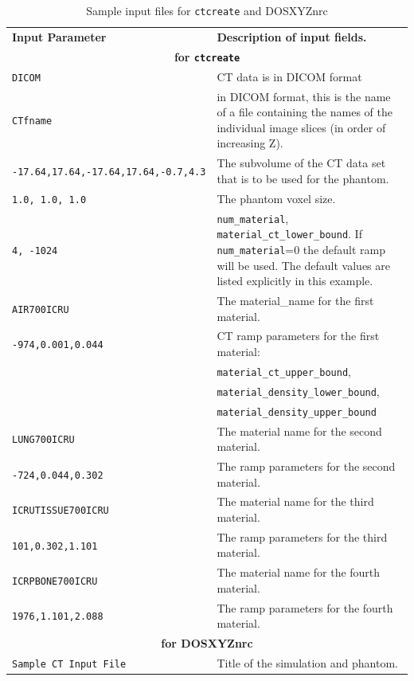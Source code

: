 \documentclass[12pt,twoside]{article}      %
\begin{document}
\begin{table}[htbp]
\caption{Sample input files for {\tt ctcreate} and DOSXYZnrc}
\begin{tabular}{|p{7cm}p{8.7cm}|}
\hline
\bf{Input Parameter} & \bf{Description of input fields.} \\
\multicolumn{2}{|c|}{\bf for {\tt ctcreate}      } \\
{\tt DICOM} & CT data is in DICOM format \\
{\tt CTfname} & in DICOM format, this is the name of a file containing the names of the individual image slices (in order
of increasing Z).
\\
{\tt -17.64,17.64,-17.64,17.64,-0.7,4.3}
&
The subvolume of the CT data set
that is to be used for the phantom.
\\
{\tt 1.0, 1.0, 1.0 }
&
The phantom voxel size.
\\
{\tt 4, -1024}
&
{\tt num\_material}, {\tt material\_ct\_lower\_bound}.
If {\tt num\_material}=0
the default ramp will be used.
The default values are
listed explicitly in this example.
\\
{\tt AIR700ICRU }
&
The material\_name for the first material.
\\
{\tt -974,0.001,0.044}
&
CT ramp parameters for the first material:\\
&{\tt  material\_ct\_upper\_bound}, \\
&{\tt material\_density\_lower\_bound},\\
&{\tt material\_density\_upper\_bound}
\\
{\tt LUNG700ICRU }
&
The material name for the second material.
\\
{\tt -724,0.044,0.302}
&
The ramp parameters for the second material. \\
{\tt ICRUTISSUE700ICRU} & The material name for the third material.
\\
{\tt 101,0.302,1.101} & The ramp parameters for the third material.
\\
{\tt ICRPBONE700ICRU} & The material name for the fourth material.
\\
{\tt 1976,1.101,2.088} & The ramp parameters for the fourth material.
\\
\hline
\multicolumn{2}{|c|}{\bf for DOSXYZnrc} \\
{\tt Sample CT Input File } & Title of the simulation and phantom. \\

\end{tabular}
\end{table}
\end{document}
